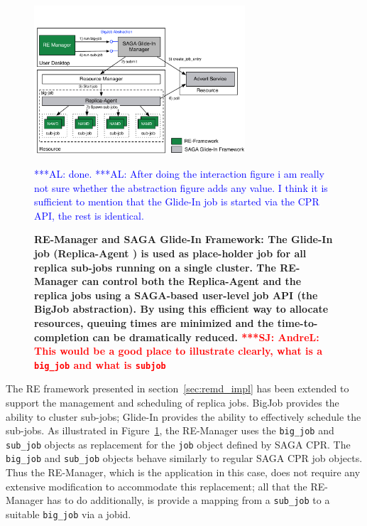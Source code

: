 \documentclass{rspublic}
\newcommand{\alnote}[1]{ {\textcolor{blue} { ***AL: #1 }}}
\newcommand{\jhanote}[1]{ {\textcolor{red} { ***SJ: #1 }}}
\newcommand{\alnote}[1]{}
\newcommand{\jhanote}[1]{}
\newcommand{\replicaagent}[1]{Replica-Agent }
\newcommand{\remanager}[1]{RE-Manager }
\begin{document}
\begin{figure}[t]
    \centering
    \includegraphics[width=0.7\textwidth]{re_bigjob_interactions}   
    \caption{\footnotesize \bf RE-Manager and SAGA Glide-In Framework:
      The Glide-In job (\replicaagent\ ) is used as place-holder job
      for all replica sub-jobs running on a single cluster. The
      \remanager\ can control both the \replicaagent\ and the replica
      jobs using a SAGA-based user-level job API (the BigJob
      abstraction). By using this efficient way to allocate resources,
      queuing times are minimized and the time-to-completion can be
      dramatically reduced. \jhanote{AndreL: This would be a good
        place to illustrate clearly, what is a \texttt{big\_job} and
        what is \texttt{sub\-job}}} \alnote{done.} \alnote{After doing
      the interaction figure i am really not sure whether the
      abstraction figure adds any value. I think it is sufficient to
      mention that the Glide-In job is started via the CPR API, the
      rest is identical.}
    \label{fig:remdmanager_v1.1}
\end{figure}
    
The RE framework presented in section~\ref{sec:remd_impl} has been
extended to support the management and scheduling of replica jobs.
BigJob provides the ability to cluster sub-jobs; Glide-In provides the
ability to effectively schedule the sub-jobs.  As illustrated in
Figure~\ref{fig:remdmanager_v1.1}, the RE-Manager uses the
\texttt{big\_job} and \texttt{sub\_job} objects as replacement for the
\texttt{job} object defined by SAGA CPR.  The \texttt{big\_job} and
\texttt{sub\_job} objects behave similarly to regular SAGA CPR job
objects. Thus the RE-Manager, which is the application in this case,
does not require any extensive modification to accommodate this
replacement; all that the RE-Manager has to do additionally, is
provide a mapping from a \texttt{sub\_job} to a suitable
\texttt{big\_job} via a jobid.
\end{document}
